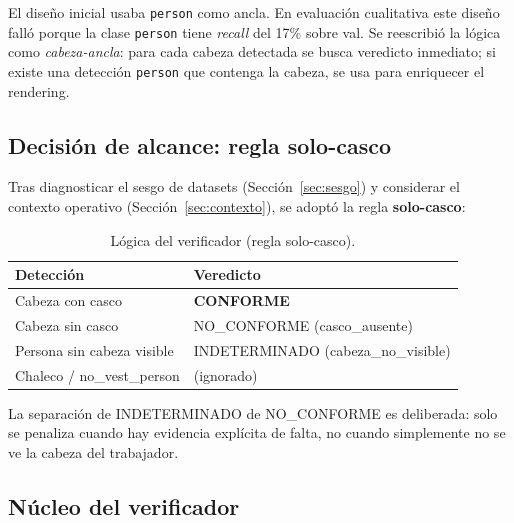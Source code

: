 \documentclass[conference]{IEEEtran}
\begin{document}
El diseño inicial usaba \texttt{person} como ancla. En evaluación
cualitativa este diseño falló porque la clase \texttt{person} tiene
\emph{recall} del 17\% sobre val. Se reescribió la lógica como
\emph{cabeza-ancla}: para cada cabeza detectada se busca veredicto
inmediato; si existe una detección \texttt{person} que contenga la
cabeza, se usa para enriquecer el rendering.

\subsection{Decisión de alcance: regla solo-casco}
\label{sec:decision_alcance}

Tras diagnosticar el sesgo de datasets (Sección~\ref{sec:sesgo}) y
considerar el contexto operativo (Sección~\ref{sec:contexto}), se
adoptó la regla \textbf{solo-casco}:

\begin{table}[h]
\centering
\caption{Lógica del verificador (regla solo-casco).}
\label{tab:logica}
\renewcommand{\arraystretch}{1.15}
\begin{tabular}{p{3.5cm} l}
\toprule
\textbf{Detección} & \textbf{Veredicto} \\
\midrule
Cabeza con casco & \textbf{CONFORME} \\
Cabeza sin casco & NO\_CONFORME (casco\_ausente) \\
Persona sin cabeza visible & INDETERMINADO (cabeza\_no\_visible) \\
Chaleco / no\_vest\_person & (ignorado) \\
\bottomrule
\end{tabular}
\end{table}

La separación de INDETERMINADO de NO\_CONFORME es deliberada: solo
se penaliza cuando hay evidencia explícita de falta, no cuando
simplemente no se ve la cabeza del trabajador.

\subsection{Núcleo del verificador}
\end{document}
